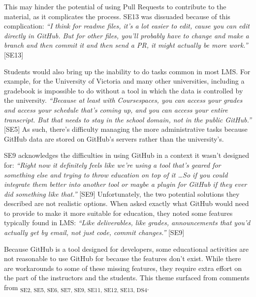 This may hinder the potential of using Pull Requests to contribute to the material, as it complicates the process. SE13 was dissuaded because of this complication: \textit{``I think for readme files, it's a lot easier to edit, cause you can edit directly in GitHub. But for other files, you'll probably have to change and make a branch and then commit it and then send a PR, it might actually be more work.''} [SE13]

Students would also bring up the inability to do tasks common in most LMS. For example, for the University of Victoria and many other universities, including a gradebook is impossible to do without a tool in which the data is controlled by the university. \textit{``Because at least with Coursespaces, you can access your grades and access your schedule that's coming up, and you can access your entire transcript. But that needs to stay in the school domain, not in the public GitHub.''} [SE5] As such, there's difficulty managing the more administrative tasks because GitHub data are stored on GitHub's servers rather than the university's.


SE9 acknowledges the difficulties in using GitHub in a context it wasn't designed for: \textit{``Right now it definitely feels like we're using a tool that's geared for something else and trying to throw education on top of it \ldots So if you could integrate them better into another tool or maybe a plugin for GitHub if they ever did something like that.''} [SE9] Unfortunately, the two potential solutions they described are not realistic options. When asked exactly what GitHub would need to provide to make it more suitable for education, they noted some features typically found in LMS: \textit{``Like deliverables, like grades, announcements that you'd actually get by email, not just code, commit changes.''} [SE9]

Because GitHub is a tool designed for developers, some educational activities are not reasonable to use GitHub for because the features don't exist. While there are workarounds to some of these missing features, they require extra effort on the part of the instructors and the students. This theme surfaced from comments from \textsubscript{SE2, SE5, SE6, SE7, SE9, SE11, SE12, SE13, DS4}. \\

